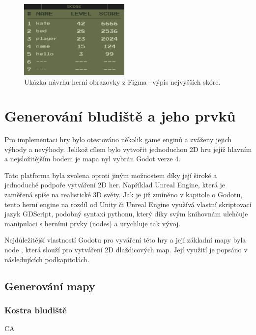 \begin{figure}[H]
    \centering
    \includegraphics[width=0.48\textwidth]{obrazky-figures/ch3/Score_screen.png}\hspace{0.1cm}
    \caption{Ukázka návrhu herní obrazovky z Figma\,--\,výpis nejvyšších skóre.}
    \label{fig:score_screen}
\end{figure}

\chapter{Generování bludiště a jeho prvků} \label{chap:Generování herního bludiště a jeho prvků}
Pro implementaci hry bylo otestováno několik game enginů a zváženy jejich výhody a nevýhody. Jelikož cílem bylo vytvořit jednoduchou 2D hru jejíž hlavním a nejsložitějším bodem je mapa nyl vybrán Godot verze 4. 

Tato platforma byla zvolena oproti jiným možnostem díky její široké a jednoduché podpoře vytváření 2D her. Například Unreal Engine, která je zaměřená spíše na realistické 3D světy. Jak je již zmíněno v kapitole o Godotu, tento herní engine na rozdíl od Unity či Unreal Engine využívá vlastní skriptovací jazyk GDScript, podobný syntaxí pythonu, který díky svým knihovnám ulehčuje manipulaci s herními prvky (nodes) a urychluje tak vývoj.

Nejdůležitější vlastností Godotu pro vyváření této hry a její základní mapy byla node , která slouží pro vytváření 2D dlaždicových map. Její využití je popsáno v následujících podkapitolách.
    
\section{Generování mapy}
\subsection*{Kostra bludiště}
CA
